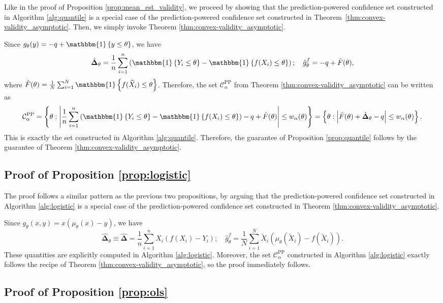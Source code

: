 \documentclass[10pt]{article}
\newcommand{\ind}[1]{\mathbbm{1}\left\{#1\right\}}
\newcommand{\Xt}{\widetilde{X}}
\newcommand{\rechat}{\hat{\mathbf{\Delta}}}
\newcommand{\CPP}{\mathcal{C}^{\mathrm{PP}}}
\begin{document}
Like in the proof of Proposition \ref{prop:mean_est_validity}, we proceed by showing that the prediction-powered confidence set constructed in Algorithm \ref{alg:quantile} is a special case of the prediction-powered confidence set constructed in Theorem~\ref{thm:convex-validity_asymptotic}. Then, we simply invoke Theorem \ref{thm:convex-validity_asymptotic}.

Since $g_\theta(y) = -q + \ind{y \leq \theta}$, we have
$$\rechat_{\theta} = \frac{1}{n} \sum_{i=1}^n \left(\ind{Y_i \leq \theta} - \ind{f(X_i) \leq \theta} \right);\quad \hat g^f_{\theta} = -q + \hat F(\theta),$$
where $\hat F(\theta) = \frac{1}{N} \sum_{i=1}^N \ind{f(\Xt_i) \leq \theta}$.
Therefore, the set $\CPP_\alpha$ from Theorem \ref{thm:convex-validity_asymptotic} can be written as
$$\CPP_\alpha = \left\{\theta: \left|\frac{1}{n} \sum_{i=1}^n \left(\ind{Y_i \leq \theta} - \ind{f(X_i) \leq \theta} \right) - q + \hat F(\theta)\right| \leq w_\alpha(\theta)\right\} = \left\{\theta: \left|\hat F(\theta)+\rechat_{\theta} - q\right| \leq w_\alpha(\theta)\right\}.$$
This is exactly the set constructed in Algorithm \ref{alg:quantile}. Therefore, the guarantee of Proposition \ref{prop:quantile} follows by the guarantee of Theorem \ref{thm:convex-validity_asymptotic}.


\subsection{Proof of Proposition \ref{prop:logistic}}

The proof follows a similar pattern as the previous two propositions, by arguing that the prediction-powered confidence set constructed in Algorithm \ref{alg:logistic} is a special case of the prediction-powered confidence set constructed in Theorem \ref{thm:convex-validity_asymptotic}.

Since $g_\theta(x,y) = x(\mu_\theta(x) - y)$, we have
$$\rechat_{\theta} \equiv \rechat = \frac 1 n \sum_{i=1}^n X_i (f(X_i) - Y_i);\quad \hat g^f_{\theta} = \frac{1}{N} \sum_{i=1}^N \Xt_i (\mu_\theta(\Xt_i) - f(\Xt_i)).$$
These quantities are explicitly computed in Algorithm \ref{alg:logistic}. Moreover, the set $\CPP_\alpha$ constructed in Algorithm \ref{alg:logistic} exactly follows the recipe of Theorem \ref{thm:convex-validity_asymptotic}, so the proof immediately follows.

\subsection{Proof of Proposition \ref{prop:ols}}
\end{document}
